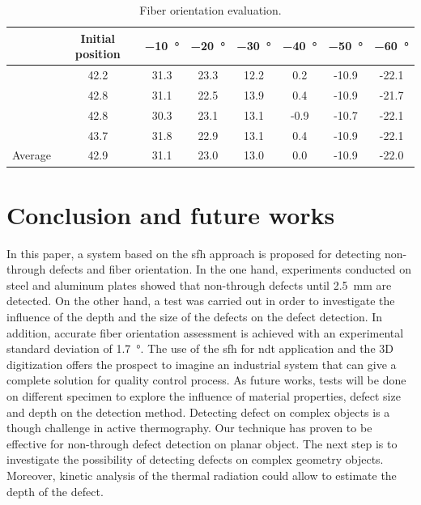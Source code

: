 \documentclass[12pt]{spieman}
\begin{document}
\begin{spacing}{2}
\begin{table}[h]
  \caption{Fiber orientation evaluation.} 
  \label{tab:1}
  \begin{center}       
    \begin{tabular}{lccccccc} 
      \hline
      \rule[-1ex]{0pt}{3.5ex}  & Initial position & \SI{-10}{\degree} & \SI{-20}{\degree} & \SI{-30}{\degree} & \SI{-40}{\degree} & \SI{-50}{\degree} & \SI{-60}{\degree} \\
      \hline\hline
      \rule[-1ex]{0pt}{3.5ex}  \multirow{4}{*}{Measurements} & 42.2 & 31.3 & 23.3 & 12.2 & 0.2 & -10.9 & -22.1  \\
      \rule[-1ex]{0pt}{3.5ex}   & 42.8 & 31.1 & 22.5 & 13.9 & 0.4 & -10.9 & -21.7  \\
      \rule[-1ex]{0pt}{3.5ex}   & 42.8 & 30.3 & 23.1 & 13.1 & -0.9 & -10.7 & -22.1  \\
      \rule[-1ex]{0pt}{3.5ex}   & 43.7 & 31.8 & 22.9 & 13.1 & 0.4 & -10.9 & -22.1  \\
      \hline
      \rule[-1ex]{0pt}{3.5ex}  Average & 42.9 & 31.1 & 23.0 & 13.0 & 0.0 & -10.9 & -22.0 \\
      \hline
    \end{tabular}
  \end{center}
\end{table}


% 
\newpage

\section{Conclusion and future works}\label{sec:5}

In this paper, a system based on the \ac{sfh} approach is proposed for detecting non-through defects and fiber orientation. 
In the one hand, experiments conducted on steel and aluminum plates showed that non-through defects until \SI{2.5}{\milli \metre} are detected. 
On the other hand, a test was carried out in order to investigate the influence of the depth and the size of the defects on the defect detection.
In addition, accurate fiber orientation assessment is achieved with an experimental standard deviation of \SI{1.7}{\degree}. 
The use of the \ac{sfh} for \ac{ndt} application and the 3D digitization offers the prospect to imagine an industrial system that can give a complete solution for quality control process. 
As future works, tests will be done on different specimen to explore the influence of material properties, defect size and depth on the detection method. 
Detecting defect on complex objects is a though challenge in active thermography. 
Our technique has proven to be effective for non-through defect detection on planar object. 
The next step is to investigate the possibility of detecting defects on complex geometry objects.   
Moreover, kinetic analysis of the thermal radiation could allow to estimate the depth of the defect.


\end{spacing}
\end{document}
